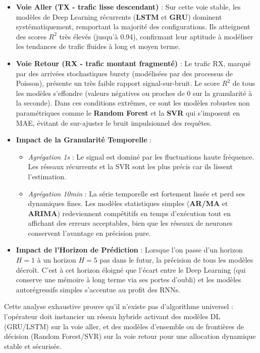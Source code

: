 \documentclass[11pt,a4paper]{article}
\begin{document}
\begin{itemize}
    \item \textbf{Voie Aller (TX - trafic lisse descendant)} : Sur cette voie stable, les modèles de Deep Learning récurrents (\textbf{LSTM} et \textbf{GRU}) dominent systématiquement, remportant la majorité des configurations. Ils atteignent des scores $R^2$ très élevés (jusqu'à 0.94), confirmant leur aptitude à modéliser les tendances de trafic fluides à long et moyen terme.
    \item \textbf{Voie Retour (RX - trafic montant fragmenté)} : Le trafic RX, marqué par des arrivées stochastiques bursty (modélisées par des processus de Poisson), présente un très faible rapport signal-sur-bruit. Le score $R^2$ de tous les modèles s'effondre (valeurs négatives ou proches de 0 sur la granularité à la seconde). Dans ces conditions extrêmes, ce sont les modèles robustes non paramétriques comme le \textbf{Random Forest} et la \textbf{SVR} qui s'imposent en MAE, évitant de sur-ajuster le bruit impulsionnel des requêtes.
    \item \textbf{Impact de la Granularité Temporelle} :
    \begin{itemize}
        \item \textit{Agrégation 1s} : Le signal est dominé par les fluctuations haute fréquence. Les réseaux récurrents et la SVR sont les plus précis car ils lissent l'estimation.
        \item \textit{Agrégation 10min} : La série temporelle est fortement lissée et perd ses dynamiques fines. Les modèles statistiques simples (\textbf{AR/MA} et \textbf{ARIMA}) redeviennent compétitifs en temps d'exécution tout en affichant des erreurs acceptables, bien que les réseaux de neurones conservent l'avantage en précision pure.
    \end{itemize}
    \item \textbf{Impact de l'Horizon de Prédiction} : Lorsque l'on passe d'un horizon $H=1$ à un horizon $H=5$ pas dans le futur, la précision de tous les modèles décroît. C'est à cet horizon éloigné que l'écart entre le Deep Learning (qui conserve une mémoire à long terme via ses portes d'oubli) et les modèles autorégressifs simples s'accentue au profit des RNNs.
\end{itemize}

Cette analyse exhaustive prouve qu'il n'existe pas d'algorithme universel : l'opérateur doit instancier un réseau hybride activant des modèles DL (GRU/LSTM) sur la voie aller, et des modèles d'ensemble ou de frontières de décision (Random Forest/SVR) sur la voie retour pour une allocation dynamique stable et sécurisée.
\end{document}
